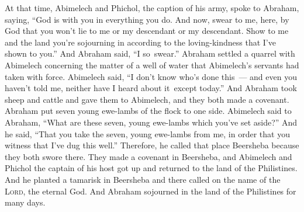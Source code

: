 \begin{inparaenum}
     At that time, Abimelech and Phichol, the caption of his army, spoke to Abraham, saying, ``God is with you in everything you do.%
     And now, swear to me, here, by God that you won't lie to me or my descendant or my descendant. Show to me and the land you're sojourning in according to the loving-kindness that I've shown to you.''%
     And Abraham said, ``I so\understood\ swear.''%
     Abraham settled a quarrel with Abimelech concerning the matter of a well of water that Abimelech's servants had taken with force.%
     Abimelech said, ``I don't know who's done this~--- and even you haven't told me, neither have I heard {about it}\understood\ except today.''%
     And Abraham took sheep and cattle and gave them to Abimelech, and they both made a covenant.%
     Abraham put seven young ewe-lambs of the flock to one side.%
     Abimelech said to Abraham, ``What are these seven, young ewe-lambs which you've set aside?''%
     And he said, ``That you take the seven, young ewe-lambs from me, in order that you witness that I've dug this well.''%
     Therefore, he called that place Beersheba because they both swore there.%
     They made a covenant in Beersheba, and Abimelech and Phichol the captain of his host got up and returned to the land of the Philistines.%
     And he planted a tamarisk in Beersheba and there called on the name of the \textsc{Lord}, the eternal God.%
     And Abraham sojourned in the land of the Philistines for many days.%
\end{inparaenum}

